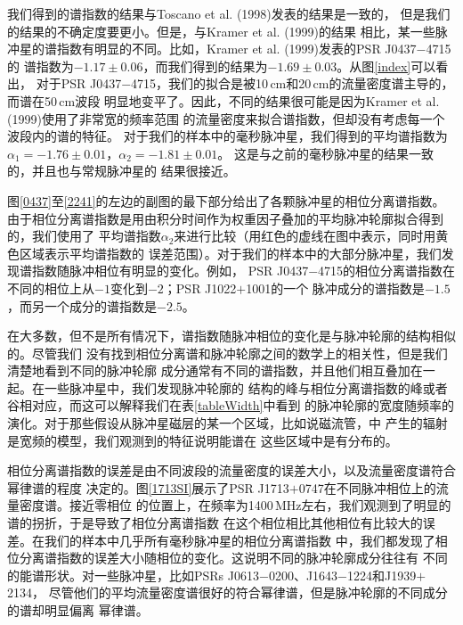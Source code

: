 我们得到的谱指数的结果与Toscano et al. (1998)\supercite{Toscano98}发表的结果是一致的，
但是我们的结果的不确定度要更小。但是，与Kramer et al. (1999)\supercite{Kramer99}的结果
相比，某一些脉冲星的谱指数有明显的不同。比如，Kramer et al. (1999)发表的PSR J0437$-$4715的
谱指数为$-1.17\pm0.06$，而我们得到的结果为$-1.69\pm0.03$。从图\ref{index}可以看出，
对于PSR J0437$-$4715，我们的拟合是被10\,cm和20\,cm的流量密度谱主导的，而谱在50\,cm波段
明显地变平了。因此，不同的结果很可能是因为Kramer et al. (1999)使用了非常宽的频率范围
的流量密度来拟合谱指数，但却没有考虑每一个波段内的谱的特征。
%
对于我们的样本中的毫秒脉冲星，我们得到的平均谱指数为$\alpha_1=-1.76\pm0.01$，$\alpha_2=-1.81\pm0.01$。
这是与之前的毫秒脉冲星的结果一致的\supercite{Toscano98,Kramer99}，并且也与常规脉冲星的
结果很接近\supercite{Lorimer95,Maron00}。

图\ref{0437}至\ref{2241}的左边的副图的最下部分给出了各颗脉冲星的相位分离谱指数。
由于相位分离谱指数是用由积分时间作为权重因子叠加的平均脉冲轮廓拟合得到的，我们使用了
平均谱指数$\alpha_2$来进行比较（用红色的虚线在图中表示，同时用黄色区域表示平均谱指数的
误差范围）。对于我们的样本中的大部分脉冲星，我们发现谱指数随脉冲相位有明显的变化。例如，
PSR J0437$-$4715的相位分离谱指数在不同的相位上从$-1$变化到$-2$；PSR J1022$+$1001的一个
脉冲成分的谱指数是$-1.5$，而另一个成分的谱指数是$-2.5$。

在大多数，但不是所有情况下，谱指数随脉冲相位的变化是与脉冲轮廓的结构相似的。尽管我们
没有找到相位分离谱和脉冲轮廓之间的数学上的相关性，但是我们清楚地看到不同的脉冲轮廓
成分通常有不同的谱指数，并且他们相互叠加在一起。在一些脉冲星中，我们发现脉冲轮廓的
结构的峰与相位分离谱指数的峰或者谷相对应，而这可以解释我们在表\ref{tableWidth}中看到
的脉冲轮廓的宽度随频率的演化。对于那些假设从脉冲星磁层的某一个区域，比如说磁流管，中
产生的辐射是宽频的模型\supercite{Michel87,Dyks10,Wang14}，我们观测到的特征说明能谱在
这些区域中是有分布的。

相位分离谱指数的误差是由不同波段的流量密度的误差大小，以及流量密度谱符合幂律谱的程度
决定的。图\ref{1713SI}展示了PSR J1713$+$0747在不同脉冲相位上的流量密度谱。接近零相位
的位置上，在频率为1400\,MHz左右，我们观测到了明显的谱的拐折，于是导致了相位分离谱指数
在这个相位相比其他相位有比较大的误差。在我们的样本中几乎所有毫秒脉冲星的相位分离谱指数
中，我们都发现了相位分离谱指数的误差大小随相位的变化。这说明不同的脉冲轮廓成分往往有
不同的能谱形状。对一些脉冲星，比如PSRs J0613$-$0200、J1643$-$1224和J1939$+$2134，
尽管他们的平均流量密度谱很好的符合幂律谱，但是脉冲轮廓的不同成分的谱却明显偏离
幂律谱。

